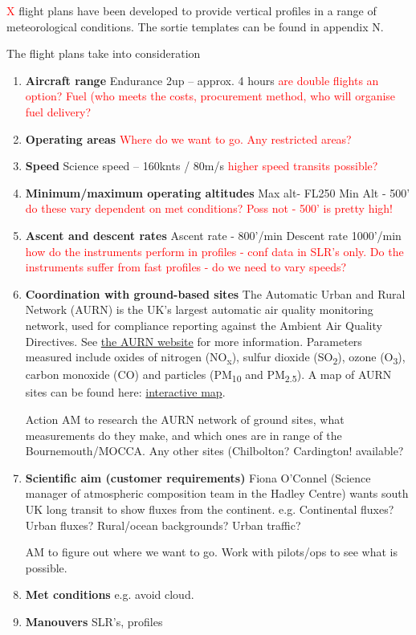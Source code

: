 \documentclass[11pt]{article} %
\begin{document}
\textcolor{red}{X} flight plans have been developed to provide vertical profiles in a range of meteorological conditions. The sortie templates can be found in appendix N.
 
The flight plans take into consideration
\begin{enumerate}
\item \textbf{Aircraft range}
Endurance 2up – approx. 4 hours
\textcolor{red}{are double flights an option? Fuel (who meets the costs, procurement method, who will organise fuel delivery?}

\item \textbf{Operating areas}
\textcolor{red}{Where do we want to go. Any restricted areas?}

\item \textbf{Speed}
Science speed – 160knts / 80m/s 
\textcolor{red}{higher speed transits possible?}

\item \textbf{Minimum/maximum operating altitudes}
Max alt-  FL250
Min Alt - 500’
\textcolor{red}{do these vary dependent on met conditions? Poss not - 500' is pretty high!}

\item \textbf{Ascent and descent rates}
Ascent rate -  800’/min
Descent rate 1000’/min 
\textcolor{red}{how do the instruments perform in profiles - conf data in SLR's only. Do the instruments suffer from fast profiles - do we need to vary speeds?}

\item \textbf{Coordination with ground-based sites}
The Automatic Urban and Rural Network (AURN) is the UK's largest automatic air quality monitoring network, used for compliance reporting against the Ambient Air Quality Directives. See \href{https://uk-air.defra.gov.uk/networks/network-info?view=aurn}{the AURN website} for more information. Parameters measured include oxides of nitrogen (NO\textsubscript{x}), sulfur dioxide (SO\textsubscript{2}), ozone (O\textsubscript{3}), carbon monoxide (CO) and particles (PM\textsubscript{10} and PM\textsubscript{2.5}). A map of AURN sites can be found here: \href{https://uk-air.defra.gov.uk/interactive-map?network=aurn}{interactive map}.

Action AM to research the AURN network of ground sites, what measurements do they make, and which ones are in range of the Bournemouth/MOCCA.
Any other sites (Chilbolton? Cardington! available?

\item \textbf{Scientific aim (customer requirements)}
Fiona O'Connel (Science manager of atmospheric composition team in the Hadley Centre) wants south UK long transit to show fluxes from the continent.
e.g. Continental fluxes? Urban fluxes? Rural/ocean backgrounds? Urban traffic?

AM to figure out where we want to go. Work with pilots/ops to see what is possible. 

\item \textbf{Met conditions}
e.g. avoid cloud. 

\item \textbf{Manouvers}
SLR's, profiles
\end{enumerate}
\end{document}
